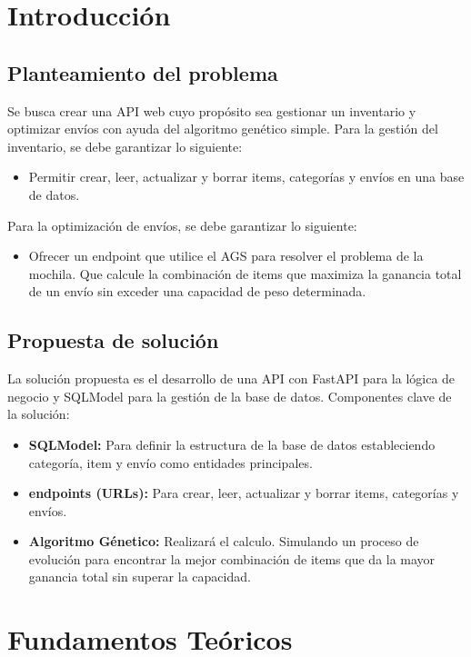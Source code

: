 \documentclass[12pt]{article}
\begin{document}
\newpage
\tableofcontents
\newpage

\section{Introducción}
\subsection*{Planteamiento del problema}
Se busca crear una API web cuyo propósito sea gestionar un inventario y optimizar envíos con ayuda del algoritmo genético simple.
Para la gestión del inventario, se debe garantizar lo siguiente:
\begin{itemize}
    \item Permitir crear, leer, actualizar y borrar items, categorías y envíos en una base de datos.
\end{itemize}

Para la optimización de envíos, se debe garantizar lo siguiente:
\begin{itemize}
    \item Ofrecer un endpoint que utilice el AGS para resolver el problema de la mochila. Que calcule la combinación de items que maximiza la ganancia total de un envío sin exceder una capacidad de peso determinada.
\end{itemize}


\subsection*{Propuesta de solución}
La solución propuesta es el desarrollo de una API con FastAPI para la lógica de negocio y SQLModel para la gestión de la base de datos.
Componentes clave de la solución:
\begin{itemize}
    \item \textbf{SQLModel:} Para definir la estructura de la base de datos estableciendo categoría, item y envío como entidades principales.
    \item \textbf{endpoints (URLs):} Para crear, leer, actualizar y borrar items, categorías y envíos.
    \item \textbf{Algoritmo Génetico:} Realizará el calculo. Simulando un proceso de evolución para encontrar la mejor combinación de items que da la mayor ganancia total sin superar la capacidad.
\end{itemize}

\section{Fundamentos Teóricos}
\end{document}
